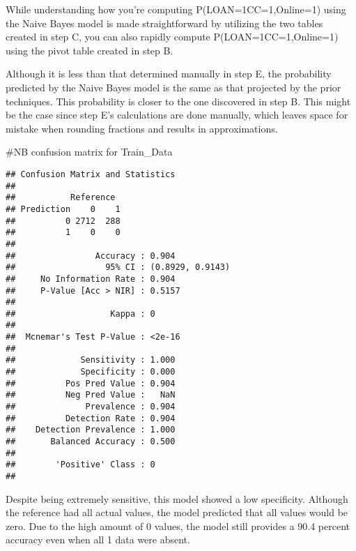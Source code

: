 \documentclass[
]{article}
\newenvironment{Shaded}{\begin{snugshade}}{\end{snugshade}}
\newcommand{\AttributeTok}[1]{\textcolor[rgb]{0.77,0.63,0.00}{#1}}
\newcommand{\FunctionTok}[1]{\textcolor[rgb]{0.00,0.00,0.00}{#1}}
\newcommand{\NormalTok}[1]{#1}
\newcommand{\OtherTok}[1]{\textcolor[rgb]{0.56,0.35,0.01}{#1}}
\newcommand{\SpecialCharTok}[1]{\textcolor[rgb]{0.00,0.00,0.00}{#1}}
\begin{document}
While understanding how you're computing P(LOAN=1\textbar CC=1,Online=1)
using the Naive Bayes model is made straightforward by utilizing the two
tables created in step C, you can also rapidly compute
P(LOAN=1\textbar CC=1,Online=1) using the pivot table created in step B.

Although it is less than that determined manually in step E, the
probability predicted by the Naive Bayes model is the same as that
projected by the prior techniques. This probability is closer to the one
discovered in step B. This might be the case since step E's calculations
are done manually, which leaves space for mistake when rounding
fractions and results in approximations.

\#NB confusion matrix for Train\_Data

\begin{Shaded}
\end{Shaded}

\begin{verbatim}
## Confusion Matrix and Statistics
## 
##           Reference
## Prediction    0    1
##          0 2712  288
##          1    0    0
##                                           
##                Accuracy : 0.904           
##                  95% CI : (0.8929, 0.9143)
##     No Information Rate : 0.904           
##     P-Value [Acc > NIR] : 0.5157          
##                                           
##                   Kappa : 0               
##                                           
##  Mcnemar's Test P-Value : <2e-16          
##                                           
##             Sensitivity : 1.000           
##             Specificity : 0.000           
##          Pos Pred Value : 0.904           
##          Neg Pred Value :   NaN           
##              Prevalence : 0.904           
##          Detection Rate : 0.904           
##    Detection Prevalence : 1.000           
##       Balanced Accuracy : 0.500           
##                                           
##        'Positive' Class : 0               
## 
\end{verbatim}

Despite being extremely sensitive, this model showed a low specificity.
Although the reference had all actual values, the model predicted that
all values would be zero. Due to the high amount of 0 values, the model
still provides a 90.4 percent accuracy even when all 1 data were absent.
\end{document}
